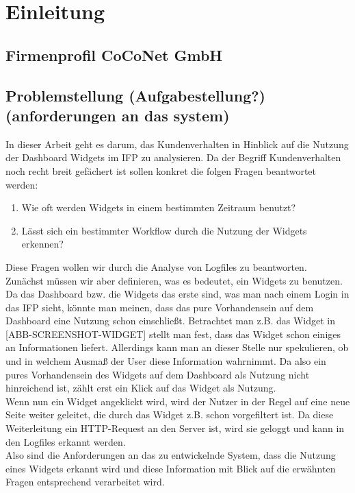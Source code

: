 \section{Einleitung}\raggedbottom
\label{sec:Einleutung}

\subsection{Firmenprofil CoCoNet GmbH}
\label{sub:Firmenprofil CoCoNet GmbH}

\subsection{Problemstellung (Aufgabestellung?) (anforderungen an das system)}
\label{sub:Problemstellung}
In dieser Arbeit geht es darum, das Kundenverhalten in Hinblick auf die Nutzung der Dashboard Widgets im IFP zu analysieren. Da der Begriff Kundenverhalten noch recht breit gefächert ist sollen konkret die folgen Fragen beantwortet werden:
\begin{enumerate}
	\item Wie oft werden Widgets in einem bestimmten Zeitraum benutzt?\\
	\item Lässt sich ein bestimmter Workflow durch die Nutzung der Widgets erkennen?\\
\end{enumerate}
Diese Fragen wollen wir durch die Analyse von Logfiles zu beantworten.\\
Zunächst müssen wir aber definieren, was es bedeutet, ein Widgets zu benutzen. Da das Dashboard bzw. die Widgets das erste sind, was man nach einem Login in das IFP sieht, könnte man meinen, dass das pure Vorhandensein auf dem Dashboard eine Nutzung schon einschließt. Betrachtet man z.B. das Widget in [ABB-SCREENSHOT-WIDGET] stellt man fest, dass das Widget schon einiges an Informationen liefert. Allerdings kann man an dieser Stelle nur spekulieren, ob und in welchem Ausmaß der User diese Information wahrnimmt. Da also ein pures Vorhandensein des Widgets auf dem Dashboard als Nutzung nicht hinreichend ist, zählt erst ein Klick auf das Widget als Nutzung.\\
Wenn nun ein Widget angeklickt wird, wird der Nutzer in der Regel auf eine neue Seite weiter geleitet, die durch das Widget z.B. schon vorgefiltert ist. Da diese Weiterleitung ein HTTP-Request an den Server ist, wird sie geloggt und kann in den Logfiles erkannt werden.\\
Also sind die Anforderungen an das zu entwickelnde System, dass die Nutzung eines Widgets erkannt wird und diese Information mit Blick auf die erwähnten Fragen entsprechend verarbeitet wird.

